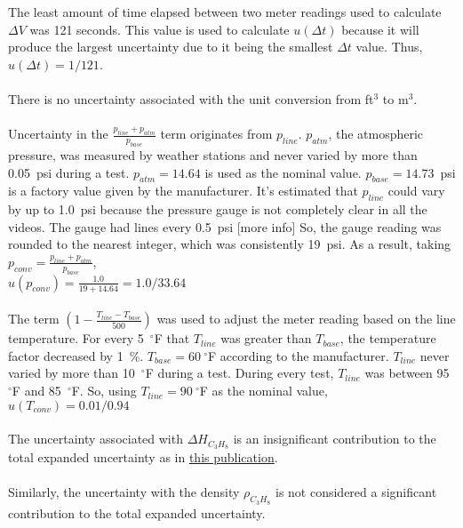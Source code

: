 \documentclass[12pt]{article}
\begin{document}
The least amount of time elapsed between two meter readings used to calculate $\Delta V$ was 121 seconds. This value is used to calculate $u(\Delta t)$ because it will produce the largest uncertainty due to it being the smallest $\Delta t$ value. Thus, 
\vspace{3pt}
\\
\indent \underline{$u(\Delta t)=1/121$}.  
\\~\\
There is no uncertainty associated with the unit conversion from ft$^3$ to m$^3$.
\\~\\
Uncertainty in the $\frac{p_{line}+p_{atm}}{p_{base}}$ term originates from $p_{line}$. $p_{atm}$, the atmospheric pressure, was measured by weather stations and never varied by more than 0.05~psi during a test. $p_{atm}=14.64$ is used as the nominal value. $p_{base}=14.73$~psi is a factory value given by the manufacturer. It's estimated that $p_{line}$ could vary by up to 1.0~psi because the pressure gauge is not completely clear in all the videos. The gauge had lines every 0.5~psi [more info] So, the gauge reading was rounded to the nearest integer, which was consistently 19~psi. As a result, taking $p_{conv}=\frac{p_{line}+p_{atm}}{p_{base}}$,  
\vspace{3pt}
\\
\indent \underline{$u(p_{conv})=\frac{1.0}{19+14.64}=1.0/33.64$}
\\~\\
The term $\left( 1-\frac{T_{line}-T_{base}}{500} \right)$ was used to adjust the meter reading based on the line temperature. For every 5~$^\circ$F that $T_{line}$ was greater than $T_{base}$, the temperature factor decreased by 1~\%. $T_{base}=60~^\circ$F according to the manufacturer. $T_{line}$ never varied by more than 10~$^\circ$F during a test. During every test, $T_{line}$ was between 95~$^\circ$F and 85~$^\circ$F. So, using $T_{line}=90~^\circ$F as the nominal value, 
\vspace{3pt}
\\
\indent \underline{$u(T_{conv})=0.01/0.94$}
\\~\\
The uncertainty associated with $\Delta H_{C_3H_8}$ is an insignificant contribution to the total expanded uncertainty as in \href{http://fire.nist.gov/bfrlpubs/fire08/PDF/f08012.pdf}{this publication}.
\\~\\
Similarly, the uncertainty with the density $\rho_{C_3H_8}$ is not considered a significant contribution to the total expanded uncertainty.
\end{document}
